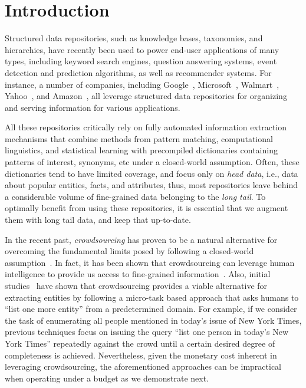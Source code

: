 


\section{Introduction}
\label{sec:intro}

Structured data repositories, such as knowledge bases, taxono\-mies, and hierarchies, have recently been used to power end-user applications of many types, including keyword search engines, question answering systems, event detection and prediction algorithms, as well as recommender systems. For instance, a number of companies, including Google~\cite{singhal2012introducing}, Microsoft~\cite{cheng2010fuzzy}, Walmart~\cite{Deshpande:2013:BMU:2463676.2465297}, Yahoo~\cite{woo}, and Amazon~\cite{amazon-product}, all leverage structured data repositories for organizing and serving information for various applications. 

All these repositories critically rely on fully automated information extraction mechanisms that combine methods from pattern matching, computational linguistics, and statistical learning with precompiled dictionaries containing patterns of interest, synonyms, etc under a closed-world assumption. Often, these dictionaries tend to have limited coverage, and focus only on {\em head data}, i.e., data about popular entities, facts, and attributes, thus, most repositories leave behind a considerable volume of fine-grained data belonging to the {\em long tail}. To optimally benefit from using these repositories, it is essential that we augment them with long tail data, and keep that up-to-date. 

In the recent past, {\em crowdsourcing} has proven to be a natural alternative for overcoming the fundamental limits posed by following a closed-world assumption~\cite{franklin:2011}. In fact, it has been shown that crowdsourcing can leverage human intelligence to provide us access to fine-grained information~\cite{deco}. Also, initial studies~\cite{trushkowsky:2013, amsterdamer:2014} have shown that crowdsourcing provides a viable alternative for extracting entities by following a micro-task based approach that asks humans to ``list one more entity'' from a predetermined domain. For example, if we consider the task of enumerating all people mentioned in today's issue of New York Times, previous techniques focus on issuing the query ``list one person in today's New York Times'' repeatedly against the crowd until a certain desired degree of completeness is achieved. Nevertheless, given the monetary cost inherent in leveraging crowdsourcing, the aforementioned approaches can be impractical when operating under a budget as we demonstrate next.

